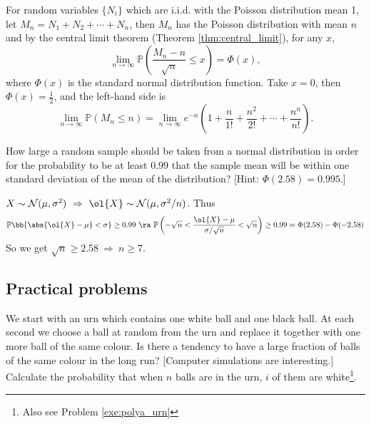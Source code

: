 \begin{solution}[\bf Solution.]
For random variables $\{N_i\}$ which are i.i.d. with the Poisson distribution mean 1, let $M_n=N_1+N_2+\cdots+N_n$, then $M_n$ has the Poisson distribution with mean $n$ and by the central limit theorem (Theorem \ref{thm:central_limit}), for any $x$,
\begin{equation}
\lim_{n\to\infty}\mathbb{P}\left(\frac{M_n- n}{\sqrt{n}}\leq x\right) = \Phi(x),
\end{equation}
where $\Phi(x)$ is the standard normal distribution function. Take $x=0$, then $\Phi(x)=\frac 12$, and the left-hand side is
\begin{equation}
\lim_{n\to\infty}\mathbb{P}\left( M_n \leq n \right) = \lim_{n\to\infty}e^{-n}\left(1+\frac{n}{1!}+\frac{n^2}{2!}+\cdots+ \frac{n^n}{n!}\right).
\end{equation}
\end{solution}


\begin{problem}
How large a random sample should be taken from a normal distribution in order for the probability to be at least 0.99 that the sample mean will be within one standard deviation of the mean of the distribution? [Hint: $\Phi(2.58)=0.995$.]
\end{problem}

\begin{solution}[\bf Solution.]
$X\sim\mathcal{N}(\mu,\sigma^2)\ \Rightarrow \ \ol{X}\sim \mathcal{N}(\mu,\sigma^2/n)$. Thus
\begin{equation}
\mathbb{P}\bb{\abs{\ol{X}-\mu}<\sigma} \geq 0.99 \ \ra \ \mathbb{P}\left(-\sqrt{n}<\frac{\ol{X}-\mu}{\sigma/\sqrt{n}}<\sqrt{n}\right) \geq 0.99 = \Phi(2.58) - \Phi(-2.58)
\end{equation}
So we get $\sqrt{n}\geq 2.58\ \Rightarrow \ n\geq 7$.
\end{solution}






\subsection{Practical problems}


\begin{problem}
We start with an urn which contains one white ball and one black ball. At each second we choose a ball at random from the urn and replace it together with one more ball of the same colour. Is there
a tendency to have a large fraction of balls of the same colour in the long run? [Computer simulations are interesting.] Calculate the probability that when $n$ balls are in the urn, $i$ of them are
white\footnote{Also see Problem \ref{exe:polya_urn}}.
\end{problem}

